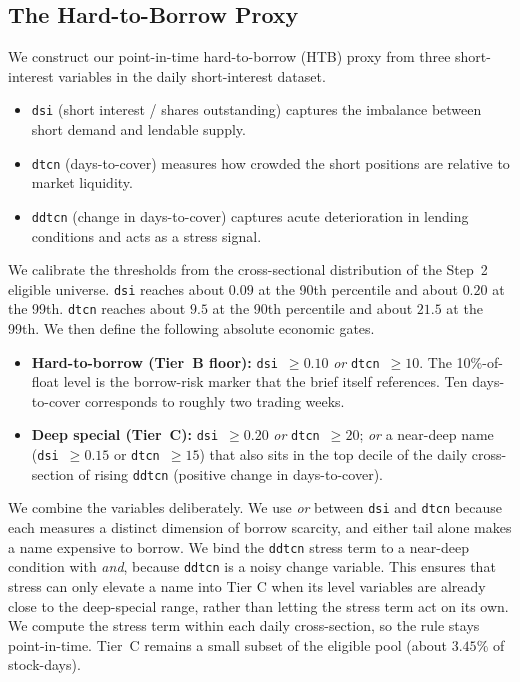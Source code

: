 \documentclass[12pt]{article}
\begin{document}
\subsection{The Hard-to-Borrow Proxy}
\label{sec:step3q1}

We construct our point-in-time hard-to-borrow (HTB) proxy from three short-interest variables in the daily short-interest dataset.

\begin{itemize}
  \item \texttt{dsi} (short interest / shares outstanding) captures the imbalance
        between short demand and lendable supply.
  \item \texttt{dtcn} (days-to-cover) measures how crowded the short positions are
        relative to market liquidity.
  \item \texttt{ddtcn} (change in days-to-cover) captures acute deterioration in
        lending conditions and acts as a stress signal.
\end{itemize}

We calibrate the thresholds from the cross-sectional distribution of the Step~2
eligible universe. \texttt{dsi} reaches about $0.09$ at the 90th percentile and
about $0.20$ at the 99th. \texttt{dtcn} reaches about $9.5$ at the 90th percentile
and about $21.5$ at the 99th. We then define the following absolute economic gates.

\begin{itemize}
  \item \textbf{Hard-to-borrow (Tier~B floor):} \texttt{dsi}~$\geq 0.10$ \emph{or}
        \texttt{dtcn}~$\geq 10$. The 10\%-of-float level is the borrow-risk marker
        that the brief itself references. Ten days-to-cover corresponds to roughly
        two trading weeks.
  \item \textbf{Deep special (Tier~C):} \texttt{dsi}~$\geq 0.20$ \emph{or}
        \texttt{dtcn}~$\geq 20$; \emph{or} a near-deep name
        (\texttt{dsi}~$\geq 0.15$ or \texttt{dtcn}~$\geq 15$) that also sits in the
        top decile of the daily cross-section of rising \texttt{ddtcn} (positive
        change in days-to-cover).
\end{itemize}

We combine the variables deliberately. We use \emph{or} between \texttt{dsi} and
\texttt{dtcn} because each measures a distinct dimension of borrow scarcity, and
either tail alone makes a name expensive to borrow. We bind the \texttt{ddtcn}
stress term to a near-deep condition with \emph{and}, because \texttt{ddtcn} is a
noisy change variable. This ensures that stress can only elevate a name into Tier C when its level variables are already close to the deep-special range, rather than letting the stress term act on its own. We
compute the stress term within each daily cross-section, so the rule stays point-in-time. Tier~C remains a small subset of the eligible pool (about $3.45\%$ of stock-days).
\end{document}
